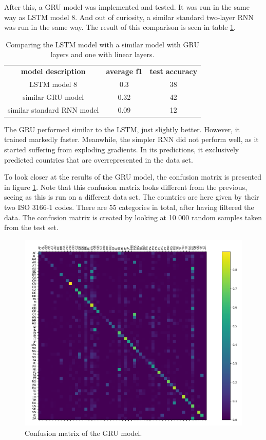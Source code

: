 \documentclass[runningheads]{llncs}
\begin{document}
After this, a GRU model was implemented and tested. It was run in the same way as LSTM model 8. And out of curiosity, a similar standard two-layer RNN was run in the same way. The result of this comparison is seen in table \ref{tab:GRU_LSTM_RNN_comp}.

\begin{table}[h!]
    \begin{center}
        \caption{Comparing the LSTM model with a similar model with GRU layers and one with linear layers.}
        \label{tab:GRU_LSTM_RNN_comp}
		\begin{tabularx}{.8\textwidth}{ | c | c | c |}
			\textbf{model description} & \textbf{average f1} & \textbf{test accuracy} \\
			LSTM model 8 & 0.3 & 38 \\
			similar GRU model & 0.32  & 42 \\
			similar standard RNN model & 0.09 & 12 \\
		\end{tabularx}  
    \end{center}
\end{table}

The GRU performed similar to the LSTM, just slightly better. However, it trained markedly faster. Meanwhile, the simpler RNN did not perform well, as it started suffering from exploding gradients. In its predictions, it exclusively predicted countries that are overrepresented in the data set. 

To look closer at the results of the GRU model, the confusion matrix is presented in figure \ref{fig:gru8}.  Note that this confusion matrix looks different from the previous, seeing as this is run on a different data set. The countries are here given by their two ISO 3166-1 codes. There are 55 categories in total, after having filtered the data. The confusion matrix is created by looking at 10 000 random samples taken from the test set.

\begin{figure}[!ht]
	\centering
	\includegraphics[width=.5\linewidth]{plots/conf_matrix_GRU_model_8.png}
	\caption{ Confusion matrix of the GRU model.}
	\label{fig:gru8}
\end{figure}
\end{document}
